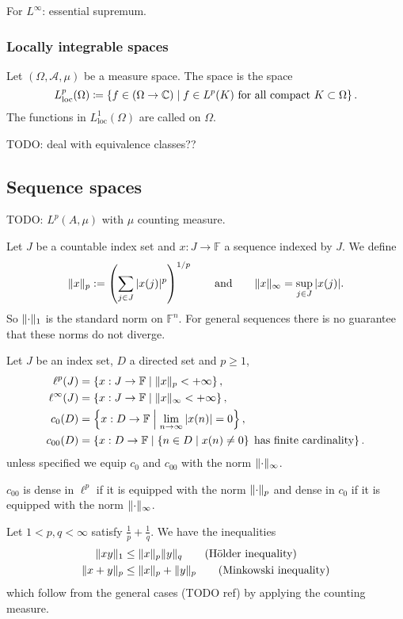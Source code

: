 For $L^\infty$: essential supremum.

\subsubsection{Locally integrable spaces}
\begin{definition}
Let $(\Omega, \mathcal{A}, \mu)$ be a measure space. The  space is the space
\[ L^p_\text{loc}(\Omega) \coloneqq \left\{ f \in (\Omega\to\mathbb{C}) \;\middle|\; \text{$f\in L^p(K)$ for all compact $K\subset \Omega$} \right\}. \]
The functions in $L^1_\text{loc}(\Omega)$ are called  on $\Omega$.
\end{definition}
TODO: deal with equivalence classes??

\subsection{Sequence spaces}
TODO:  $L^p(A,\mu)$ with $\mu$ counting measure.

Let $J$ be a countable index set and $x:J\to \mathbb{F}$ a sequence indexed by $J$. We define
\[ \lVert x\rVert_p := \left(\sum_{j\in J}|x(j)|^p\right)^{1/p} \qquad\text{and}\qquad \lVert x\rVert_\infty = \sup_{j\in J}|x(j)|. \]
So $\lVert\cdot\rVert_1$ is the standard norm on $\mathbb{F}^n$. For general sequences there is no guarantee that these norms do not diverge.
\begin{definition}
Let $J$ be an index set, $D$ a directed set and $p\geq 1$,
\begin{align*}
\ell^p(J) &= \left\{ x:J\to \mathbb{F} \;\middle|\; \lVert x\rVert_p < +\infty \right\},\\
\ell^\infty(J) &= \left\{ x:J\to \mathbb{F} \;\middle|\; \lVert x\rVert_\infty < +\infty \right\},\\
c_0(D) &= \left\{ x:D\to \mathbb{F} \;\middle|\; \lim_{n\to\infty}|x(n)| = 0 \right\}, \\
c_{00}(D) &= \left\{ x:D\to \mathbb{F} \;\middle|\; \left\{ n\in D \;\middle|\; x(n)\neq 0 \right\}\;\text{has finite cardinality} \right\}.
\end{align*}
unless specified we equip $c_0$ and $c_{00}$ with the norm $\lVert\cdot\rVert_\infty$.
\end{definition}

\begin{lemma}
$c_{00}$ is dense in $\ell^p$ if it is equipped with the norm $\lVert\cdot\rVert_p$ and dense in $c_0$ if it is equipped with the norm $\lVert\cdot\rVert_\infty$.
\end{lemma}

Let $1<p,q<\infty$ satisfy $\frac{1}{p}+\frac{1}{q}$. We have the inequalities
\begin{align*}
\lVert xy\rVert_1 &\leq \lVert x\rVert_p\lVert y\rVert_q\qquad\text{(Hölder inequality)} \\
\lVert x+y\rVert_p &\leq \lVert x\rVert_p+\lVert y\rVert_p\qquad\text{(Minkowski inequality)}
\end{align*}
which follow from the general cases (TODO ref) by applying the counting measure.

